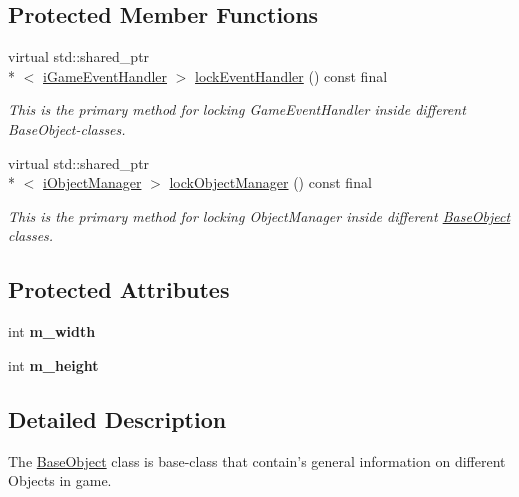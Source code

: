 \subsection*{Protected Member Functions}
\begin{DoxyCompactItemize}
\item 
virtual std\-::shared\-\_\-ptr\\*
$<$ \hyperlink{class_course_1_1i_game_event_handler}{i\-Game\-Event\-Handler} $>$ \hyperlink{class_course_1_1_base_object_aa3e1888b434e4dc1a538c652db10aecf}{lock\-Event\-Handler} () const final
\begin{DoxyCompactList}\small\item\em This is the primary method for locking Game\-Event\-Handler inside different Base\-Object-\/classes. \end{DoxyCompactList}\item 
virtual std\-::shared\-\_\-ptr\\*
$<$ \hyperlink{class_course_1_1i_object_manager}{i\-Object\-Manager} $>$ \hyperlink{class_course_1_1_base_object_adf7a5b5852467f28f0bd71c155e65718}{lock\-Object\-Manager} () const final
\begin{DoxyCompactList}\small\item\em This is the primary method for locking Object\-Manager inside different \hyperlink{class_course_1_1_base_object}{Base\-Object} classes. \end{DoxyCompactList}\end{DoxyCompactItemize}
\subsection*{Protected Attributes}
\begin{DoxyCompactItemize}
\item 
\hypertarget{class_course_1_1_base_object_a75ac4505addfb3a86f36abd3608a96a3}{int {\bfseries m\-\_\-width}}\label{class_course_1_1_base_object_a75ac4505addfb3a86f36abd3608a96a3}

\item 
\hypertarget{class_course_1_1_base_object_a1da94ddf5d0c9167f468cbb5c5afe01f}{int {\bfseries m\-\_\-height}}\label{class_course_1_1_base_object_a1da94ddf5d0c9167f468cbb5c5afe01f}

\end{DoxyCompactItemize}


\subsection{Detailed Description}
The \hyperlink{class_course_1_1_base_object}{Base\-Object} class is base-\/class that contain's general information on different Objects in game. 


